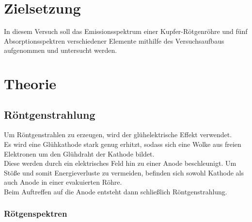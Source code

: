 \section{Zielsetzung}
\label{sec:Zielsetzung}

In diesem Versuch soll das Emissionsspektrum einer Kupfer-Rötgenröhre und 
fünf Absorptionsspektren verschiedener Elemente mithilfe des Versuchsaufbaus
aufgenommen und untersucht werden.

\section{Theorie}
\label{sec:Theorie}

\subsection{Röntgenstrahlung}

Um Röntgenstrahlen zu erzeugen, wird der glühelektrische Effekt verwendet.\\
Es wird eine Glühkathode stark genug erhitzt, sodass sich eine Wolke aus freien
Elektronen um den Glühdraht der Kathode bildet.\\
Diese werden durch ein elektrisches Feld hin zu einer Anode beschleunigt.
Um Stöße und somit Energieverluste zu vermeiden, befinden sich sowohl Kathode
als auch Anode in einer evakuierten Röhre.\\
Beim Auftreffen auf die Anode entsteht dann schließlich Röntgenstrahlung.\\

\subsubsection{Rötgenspektren}

